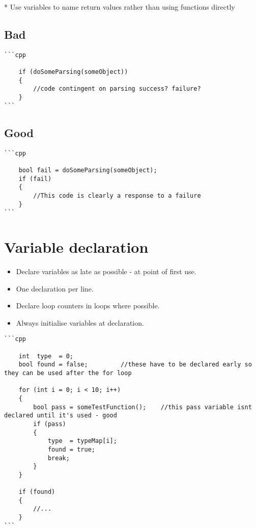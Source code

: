 * Use variables to name return values rather than using functions directly

\subsection{Bad}

\begin{verbatim}
```cpp

    if (doSomeParsing(someObject))
    {
        //code contingent on parsing success? failure?
    }
```
\end{verbatim}

\subsection{Good}
\begin{verbatim}
```cpp

    bool fail = doSomeParsing(someObject);
    if (fail)
    {
        //This code is clearly a response to a failure
    }
```
\end{verbatim}

\section{Variable declaration}

\begin{itemize}
\item Declare variables as late as possible - at point of first use.
\item One declaration per line.
\item Declare loop counters in loops where possible.
\item Always initialise variables at declaration.
\end{itemize}

\begin{verbatim}
```cpp

    int  type  = 0;
    bool found = false;         //these have to be declared early so they can be used after the for loop

    for (int i = 0; i < 10; i++)
    {
        bool pass = someTestFunction();    //this pass variable isnt declared until it's used - good
        if (pass)
        {
            type  = typeMap[i];
            found = true;
            break;
        }
    }

    if (found)
    {
        //...
    }    
```
\end{verbatim}

